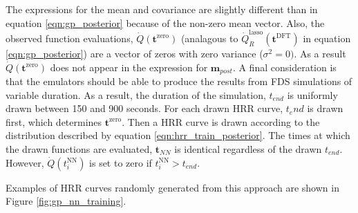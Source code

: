 \documentclass{article}
\begin{document}
The expressions for the mean and covariance are slightly different than in equation \ref{eqn:gp_posterior} because of the non-zero mean vector. Also, the observed function evaluations, $\dot{Q}(\boldsymbol{t}^{\text{zero}})$ (analagous to $\dot{Q}_{R}^{\text{lasso}}(\boldsymbol{t}^{\text{DFT}})$ in equation \ref{eqn:gp_posterior}) are a vector of zeros with zero variance ($\sigma^2=0)$. As a result $\dot{Q}(\boldsymbol{t}^{\text{zero}})$ does not appear in the expression for $\boldsymbol{m}_{post}$. A final consideration is that the emulators should be able to produce the results from FDS simulations of variable duration. As a result, the duration of the simulation, $t_{end}$ is uniformly drawn between 150 and 900 seconds. For each drawn HRR curve, $t_end$ is drawn first, which determines $\boldsymbol{t}^{\text{zero}}$. Then a HRR curve is drawn according to the distribution described by equation \ref{eqn:hrr_train_posterior}. The times at which the drawn functions are evaluated, $\boldsymbol{t}_{NN}$ is identical regardless of the drawn $t_{end}$. However, $\dot{Q}(t_i^{\text{NN}})$ is set to zero if $t^{\text{NN}}_i > t_{end}$.

Examples of HRR curves randomly generated from this approach are shown in Figure \ref{fig:gp_nn_training}. 
\end{document}
